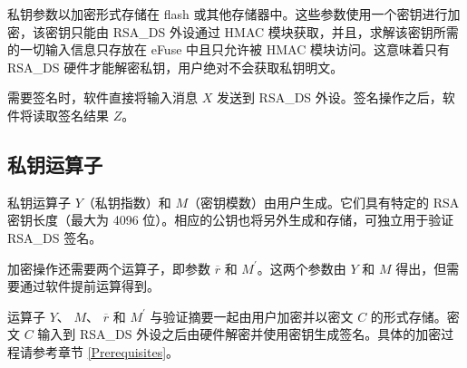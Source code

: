 \documentclass[main\_\_CN.tex]{subfiles}
\begin{document}
私钥参数以加密形式存储在 flash 或其他存储器中。这些参数使用一个密钥进行加密，该密钥只能由 RSA\_DS 外设通过 HMAC 模块获取，并且，求解该密钥所需的一切输入信息只存放在 eFuse 中且只允许被 HMAC 模块访问。这意味着只有 RSA\_DS 硬件才能解密私钥，用户绝对不会获取私钥明文。

需要签名时，软件直接将输入消息 \begin{math}X\end{math} 发送到 RSA\_DS 外设。签名操作之后，软件将读取签名结果 \begin{math}Z\end{math}。


\subsection{私钥运算子}\label{Private Key Operands}

私钥运算子 \begin{math}Y\end{math}（私钥指数）和 \begin{math}M\end{math}（密钥模数）由用户生成。它们具有特定的 RSA 密钥长度（最大为 4096 位）。相应的公钥也将另外生成和存储，可独立用于验证 RSA\_DS 签名。

加密操作还需要两个运算子，即参数 \begin{math}\overline{r}\end{math} 和 \begin{math}M^{\prime}\end{math}。这两个参数由 \begin{math}Y\end{math} 和 \begin{math}M\end{math} 得出，但需要通过软件提前运算得到。

运算子 \begin{math}Y\end{math}、
\begin{math}M\end{math}、
\begin{math}\overline{r}\end{math} 和
\begin{math}M^{\prime}\end{math} 与验证摘要一起由用户加密并以密文 \begin{math}C\end{math} 的形式存储。密文 \begin{math}C\end{math} 输入到 RSA\_DS 外设之后由硬件解密并使用密钥生成签名。具体的加密过程请参考章节 \ref{Prerequisites}。
\end{document}
